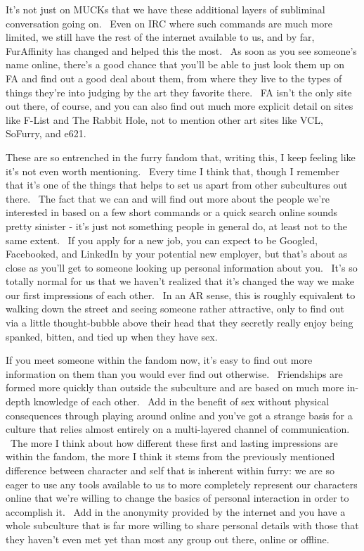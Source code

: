 It's not just on MUCKs that we have these additional layers of
subliminal conversation going on. ~Even on IRC where such commands are
much more limited, we still have the rest of the internet available to
us, and by far, FurAffinity has changed and helped this the most. ~As
soon as you see someone's name online, there's a good chance that you'll
be able to just look them up on FA and find out a good deal about them,
from where they live to the types of things they're into judging by the
art they favorite there. ~FA isn't the only site out there, of course,
and you can also find out much more explicit detail on sites like F-List
and The Rabbit Hole, not to mention other art sites like VCL, SoFurry,
and e621.

These are so entrenched in the furry fandom that, writing this, I keep
feeling like it's not even worth mentioning. ~Every time I think that,
though I remember that it's one of the things that helps to set us apart
from other subcultures out there. ~The fact that we can and will find
out more about the people we're interested in based on a few short
commands or a quick search online sounds pretty sinister - it's just not
something people in general do, at least not to the same extent. ~If you
apply for a new job, you can expect to be Googled, Facebooked, and
LinkedIn by your potential new employer, but that's about as close as
you'll get to someone looking up personal information about you. ~It's
so totally normal for us that we haven't realized that it's changed the
way we make our first impressions of each other. ~In an AR sense, this
is roughly equivalent to walking down the street and seeing someone
rather attractive, only to find out via a little thought-bubble above
their head that they secretly really enjoy being spanked, bitten, and
tied up when they have sex.

If you meet someone within the fandom now, it's easy to find out more
information on them than you would ever find out otherwise. ~Friendships
are formed more quickly than outside the subculture and are based on
much more in-depth knowledge of each other. ~Add in the benefit of sex
without physical consequences through playing around online and you've
got a strange basis for a culture that relies almost entirely on a
multi-layered channel of communication. ~The more I think about how
different these first and lasting impressions are within the fandom, the
more I think it stems from the previously mentioned difference between
character and self that is inherent within furry: we are so eager to use
any tools available to us to more completely represent our characters
online that we're willing to change the basics of personal interaction
in order to accomplish it. ~Add in the anonymity provided by the
internet and you have a whole subculture that is far more willing to
share personal details with those that they haven't even met yet than
most any group out there, online or offline.

